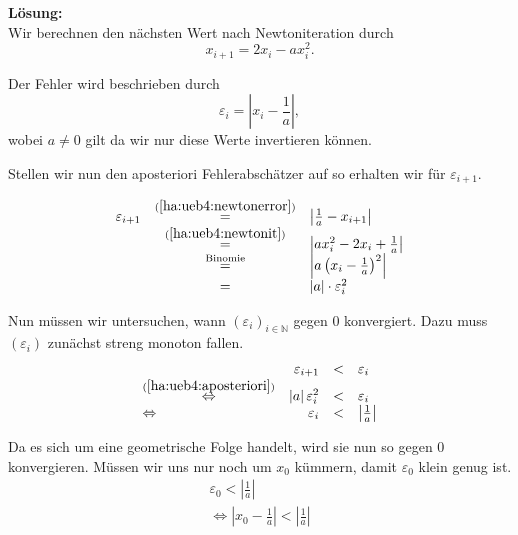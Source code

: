 \documentclass[11pt,a4paper,ngerman]{article}
\begin{document}
\textbf{Lösung:}\\

Wir berechnen den nächsten Wert nach Newtoniteration durch
\begin{equation}\label{ha:ueb4:newtonit}
    x_{i+1} = 2x_i - ax_i^2.
\end{equation}

Der Fehler wird beschrieben durch
\begin{equation}\label{ha:ueb4:newtonerror}
    \varepsilon_i = \left| x_i - \frac{1}{a} \right|,
\end{equation} wobei $a \not= 0$ gilt da wir nur
diese Werte invertieren können.

Stellen wir nun den aposteriori Fehlerabschätzer auf so erhalten wir
für $\varepsilon_{i+1}$.

\begin{equation}\label{ha:ueb4:aposteriori}\begin{array}{rcl}
    \varepsilon_{i+1} &\stackrel{(\ref{ha:ueb4:newtonerror})}{=}&
        \left| \frac{1}{a} - x_{i+1} \right|\\
    &\stackrel{(\ref{ha:ueb4:newtonit})}{=}&
        \left| ax_i^2 - 2x_i + \frac{1}{a} \right|\\
    &\stackrel{\text{Binomie}}{=}&
        \left| a \left( x_i - \frac{1}{a} \right)^2 \right|\\
    &=& |a| \cdot \varepsilon_i^2
\end{array}\end{equation}

Nun müssen wir untersuchen, wann $(\varepsilon_i)_{i\in \mathbb{N}}$ gegen $0$ konvergiert. 
Dazu muss $(\varepsilon_i)$ zunächst streng monoton fallen.
\begin{equation}\label{ha:ueb4:monoton} \begin{array}{lrcl}
    &\varepsilon_{i+1} &<& \varepsilon_i \\
    \stackrel{(\ref{ha:ueb4:aposteriori})}{\Leftrightarrow}&
         \left| a \right| \varepsilon_i^2 &<& \varepsilon_i\\
    \Leftrightarrow& \varepsilon_i &<& \left| \frac{1}{a} \right|
\end{array}\end{equation}

Da es sich um eine geometrische Folge handelt, wird sie nun so gegen 0 konvergieren.
Müssen wir uns nur noch um $x_0$ kümmern, damit $\varepsilon_0$ klein genug ist.
\begin{equation}\label{ha:ueb4:start}\begin{split}
    \varepsilon_0 < \left| \frac{1}{a} \right|\\
    \Leftrightarrow \left| x_0 - \frac{1}{a} \right| < \left| \frac{1}{a} \right|\\
\end{split}\end{equation}
\end{document}
